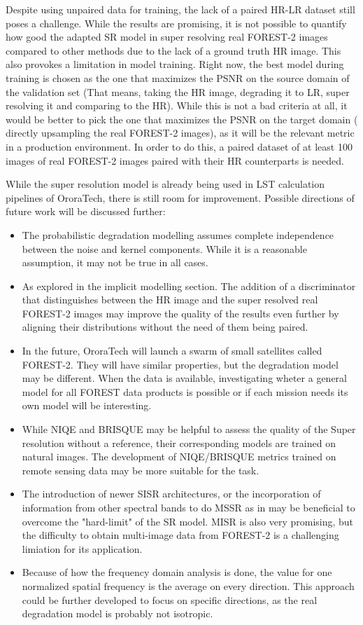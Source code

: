 Despite using unpaired data for training, the lack of a paired HR-LR dataset still poses a challenge. While the results are promising, it is not possible to quantify how good the adapted SR model in super resolving real FOREST-2 images compared to other methods due to the lack of a ground truth HR image. 
This also provokes a limitation in model training. Right now, the best model during training is chosen as the one that maximizes the PSNR on the source domain of the validation set (That means, taking the HR image, degrading it to LR, super resolving it and comparing to the HR). While this is not a bad criteria at all, it would be better to pick the one that maximizes the PSNR on the target domain ( directly upsampling the real FOREST-2 images), as it will be the relevant metric in a production environment. In order to do this, a paired dataset of at least 100 images of real FOREST-2 images paired with their HR counterparts is needed.

While the super resolution model is already being used in LST calculation pipelines of OroraTech, there is still room for improvement. Possible directions of future work will be discussed further:

\begin{itemize}
    \item The probabilistic degradation modelling assumes complete independence between the noise and kernel components. While it is a reasonable assumption, it may not be true in all cases.
    \item As explored in the implicit modelling section. The addition of a discriminator that distinguishes between the HR image and the super resolved real FOREST-2 images may improve the quality of the results even further by aligning their distributions without the need of them being paired.
    \item In the future, OroraTech will launch a swarm of small satellites called FOREST-2. They will have similar properties, but the degradation model may be different. When the data is available, investigating wheter a general model for all FOREST data products is possible or if each mission needs its own model will be interesting.
    \item While NIQE and BRISQUE may be helpful to assess the quality of the Super resolution without a reference, their corresponding models are trained on natural images. The development of NIQE/BRISQUE metrics trained on remote sensing data may be more suitable for the task.
    \item The introduction of newer SISR architectures, or the incorporation of information from other spectral bands to do MSSR as in \cite{myself2023} may be beneficial to overcome the "hard-limit" of the SR model. MISR is also very promising, but the difficulty to obtain multi-image data from FOREST-2 is a challenging limiation for its application.
    \item Because of how the frequency domain analysis is done, the value for one normalized spatial frequency is the average on every direction. This approach could be further developed to focus on specific directions, as the real degradation model is probably not isotropic.
\end{itemize}